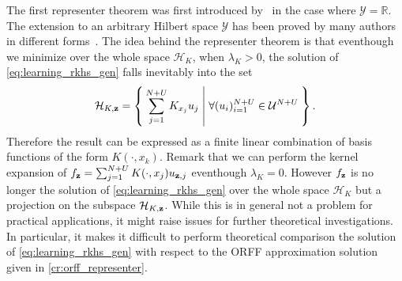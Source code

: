 The first representer theorem was first introduced by~\citet{Wahba90} in the
case where $\mathcal{Y}=\mathbb{R}$. The extension to an arbitrary Hilbert
space $\mathcal{Y}$ has been proved by many authors in different
forms~\citep{Brouard2011,kadri2015operator,Micchelli2005}. The idea behind the
representer theorem is that eventhough we minimize over the whole space
$\mathcal{H}_K$, when $\lambda_K>0$, the solution of
\cref{eq:learning_rkhs_gen} falls inevitably into the set
\begin{dmath*}
    \mathcal{H}_{K, \seq{z}}=\Set{\sum_{j=1}^{N+U}K_{x_j}u_j| \forall
    (u_i)_{i=1}^{N+U} \in\mathcal{U}^{N+U}}.
\end{dmath*}
Therefore the result can be expressed as a finite linear combination of basis
functions of the form $K(\cdot,x_k)$. Remark that we can perform the kernel
expansion of $f_{\boldsymbol{\mathbf{z}}}=\sum_{j=1}^{N+U}K(\cdot,x_j)u_{\boldsymbol{\mathbf{z}},j}$ eventhough
$\lambda_K=0$. However $f_{\boldsymbol{\mathbf{z}}}$ is no longer the solution of
\cref{eq:learning_rkhs_gen} over the whole space $\mathcal{H}_K$ but a
projection on the subspace $\mathcal{H}_{K, \boldsymbol{\mathbf{z}}}$. While this is in general
not a problem for practical applications, it might raise issues for further
theoretical investigations. In particular, it makes it difficult to perform
theoretical comparison the  solution of \cref{eq:learning_rkhs_gen}
with respect to the \acs{ORFF} approximation solution given in
\cref{cr:orff_representer}.
